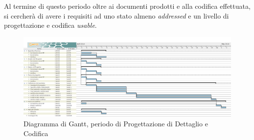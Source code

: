 Al termine di questo periodo oltre ai documenti prodotti e alla codifica effettuata, si cercherà di avere i requisiti ad uno stato almeno \textit{addressed} e un livello di progettazione e codifica \textit{usable}.\\
\begin{figure}[H] \centering \includegraphics[width=%
\textwidth]
{../modello/img/RQ.png} \caption{ Diagramma di Gantt, periodo di Progettazione di Dettaglio e Codifica}
\end{figure}
